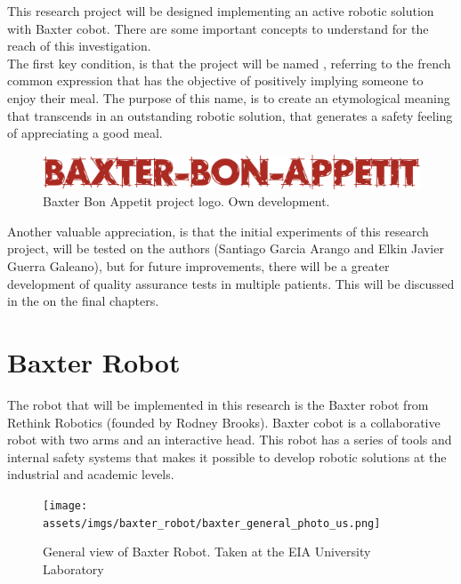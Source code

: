 \documentclass[11pt]{report} %
\begin{document}
This research project will be designed implementing an active robotic solution with Baxter cobot. There are some important concepts to understand for the reach of this investigation.\\

The first key condition, is that the project will be named , referring to the french common expression that has the objective of positively implying someone to enjoy their meal. The purpose of this name, is to create an etymological meaning that transcends in an outstanding robotic solution, that generates a safety feeling of appreciating a good meal.\\

\begin{figure}[H]
    \centering
    \includegraphics[width=0.7\linewidth]{assets/imgs/methodology/baxter_bon_appetit_logo.png}
    \caption{Baxter Bon Appetit project logo. Own development.} 
    \label{fig_baxter_bon_appetit_logo}
\end{figure}

Another valuable appreciation, is that the initial experiments of this research project, will be tested on the authors (Santiago Garcia Arango and Elkin Javier Guerra Galeano), but for future improvements, there will be a greater development of quality assurance tests in multiple patients. This will be discussed in the  on the final chapters.\\



\chapter{Baxter Robot}

The robot that will be implemented in this research is the Baxter robot from Rethink Robotics (founded by Rodney Brooks)\citep{cite_baxter_main_wiki}. Baxter cobot is a collaborative robot with two arms and an interactive head. This robot has a series of tools and internal safety systems that makes it possible to develop robotic solutions at the industrial and academic levels.\\

\begin{figure}[H]
    \centering
    \texttt{[image: assets/imgs/baxter\_robot/baxter\_general\_photo\_us.png]}
    \caption{General view of Baxter Robot. Taken at the EIA University Laboratory} 
    \label{fig_baxter_general_photo_us}
\end{figure}
\end{document}
